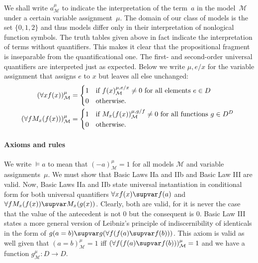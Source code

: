 \documentclass{preprint}
\renewcommand{\to}{\supvar}
\begin{document}
We shall write $a^\mu_{\mathcal{M}}$ to indicate the interpretation of the term~$a$ in the model~$\mathcal{M}$ under a certain variable assignment~$\mu$. The domain of our class of models is the set $\{0, 1, 2\}$ and thus models differ only in their interpretation of nonlogical function symbols. 
The truth tables given above in fact indicate the interpretation of terms without quantifiers. 
This makes it clear that the propositional fragment is inseparable from the quantificational one. 
The first- and second-order universal quantifiers are interpreted just as expected. Below we write $\mu, e/x$ for the variable assignment that assigns $e$ to $x$ but leaves all else unchanged:  
\begin{align*}
	(\forall x f(x))^\mu_{\mathcal{M}} &=
	\begin{cases*}
		1 & if $f(x)^{\mu, e/x}_{\mathcal{M}} \neq 0$ for all elements $e \in D$ \\
		0 & otherwise.
	\end{cases*} \\
	(\forall f M_x(f(x)))^\mu_{\mathcal{M}} &=
	\begin{cases*}
		1 & if $M_x(f(x))^{\mu, g/ f}_{\mathcal{M}} \neq 0$ for all functions $g \in D^D$ \\
		0 & otherwise.
	\end{cases*}
\end{align*}


\paragraph{Axioms and rules}

We write $\vDash a$ to mean that $(-a)^{\mu}_{\mathcal{M}}=1$ for all models $\mathcal{M}$ and variable assignments~$\mu$. We must show that Basic Laws IIa and IIb and Basic Law III are valid. 
Now, Basic Laws IIa and IIb state universal instantiation in conditional form for both universal quantifiers $\forall x f(x) \to f(a)$ and $\forall f M_x (f(x)) \to M_x (g(x))$. Clearly, both are valid, for it is never the case that the value of the antecedent is not $0$ but the consequent is $0$. 
Basic Law III states a more general version of Leibniz's principle of indiscernibility of identicals in the form of $g(a=b) \to g(\forall f(f(a) \to f(b)))$. This axiom is valid as well given that $(a=b)^{\mu}_{\mathcal{M}} = 1$ iff $(\forall f (f(a) \to f(b)))^{\mu}_{\mathcal{M}} = 1$ and we have a function $g^{\mu}_{\mathcal{M}} : D \rightarrow D$. 
\end{document}
